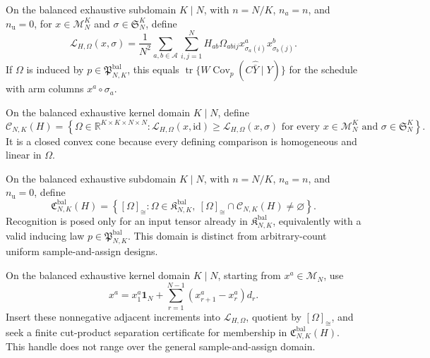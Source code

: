 On the balanced exhaustive subdomain \(K\mid N\), with \(n=N/K\), \(n_a=n\), and \(n_{\mathrm u}=0\), for \(x\in\mathcal M_N^K\) and \(\sigma\in\mathfrak S_N^K\), define
\[
\mathscr L_{H,\Omega}(x,\sigma)=\frac{1}{N^2}\sum_{a,b\in\mathcal A}\sum_{i,j=1}^N H_{ab}\Omega_{abij}x^a_{\sigma_a(i)}x^b_{\sigma_b(j)}.
\]
If \(\Omega\) is induced by \(p\in\mathfrak P^{\mathrm{bal}}_{N,K}\), this equals \(\operatorname{tr}\{W\operatorname{Cov}_p(C\widehat{\bar Y}\mid Y)\}\) for the schedule with arm columns \(x^a\circ\sigma_a\).

On the balanced exhaustive kernel domain \(K\mid N\), define
\[
\mathcal C_{N,K}(H)=\left\{\Omega\in\mathbb R^{K\times K\times N\times N}:\mathscr L_{H,\Omega}(x,\mathrm{id})\geq\mathscr L_{H,\Omega}(x,\sigma)\text{ for every }x\in\mathcal M_N^K\text{ and }\sigma\in\mathfrak S_N^K\right\}.
\]
It is a closed convex cone because every defining comparison is homogeneous and linear in \(\Omega\).

On the balanced exhaustive subdomain \(K\mid N\), with \(n=N/K\), \(n_a=n\), and \(n_{\mathrm u}=0\), define
\[
\mathfrak C^{\mathrm{bal}}_{N,K}(H)=\left\{[\Omega]_{\cong}:\Omega\in\mathfrak K^{\mathrm{bal}}_{N,K},\ [\Omega]_{\cong}\cap\mathcal C_{N,K}(H)\neq\varnothing\right\}.
\]
Recognition is posed only for an input tensor already in \(\mathfrak K^{\mathrm{bal}}_{N,K}\), equivalently with a valid inducing law \(p\in\mathfrak P^{\mathrm{bal}}_{N,K}\). This domain is distinct from arbitrary-count uniform sample-and-assign designs.

On the balanced exhaustive kernel domain \(K\mid N\), starting from \(x^a\in\mathcal M_N\), use
\[
x^a=x^a_1\mathbf 1_N+\sum_{r=1}^{N-1}(x^a_{r+1}-x^a_r)d_r.
\]
Insert these nonnegative adjacent increments into \(\mathscr L_{H,\Omega}\), quotient by \([\Omega]_{\cong}\), and seek a finite cut-product separation certificate for membership in \(\mathfrak C^{\mathrm{bal}}_{N,K}(H)\). This handle does not range over the general sample-and-assign domain.

